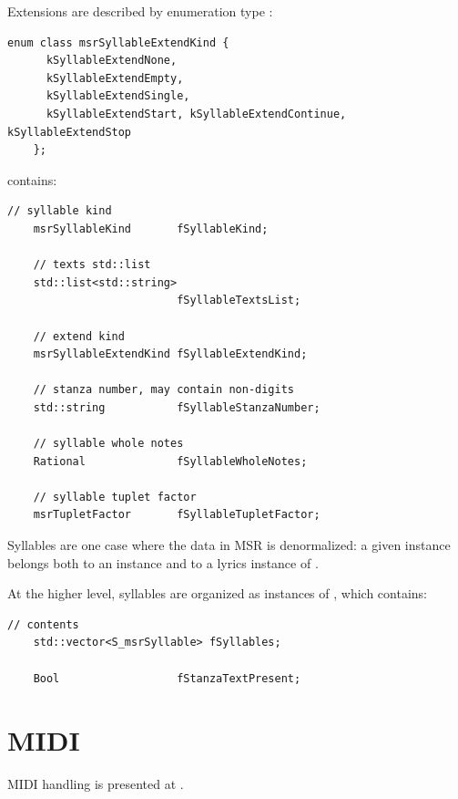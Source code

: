 Extensions are described by enumeration type {\tt }:
\begin{lstlisting}[language=CPlusPlus]
    enum class msrSyllableExtendKind {
      kSyllableExtendNone,
      kSyllableExtendEmpty,
      kSyllableExtendSingle,
      kSyllableExtendStart, kSyllableExtendContinue, kSyllableExtendStop
    };
\end{lstlisting}

 contains:
\begin{lstlisting}[language=CPlusPlus]
    // syllable kind
    msrSyllableKind       fSyllableKind;

    // texts std::list
    std::list<std::string>
                          fSyllableTextsList;

    // extend kind
    msrSyllableExtendKind fSyllableExtendKind;

    // stanza number, may contain non-digits
    std::string           fSyllableStanzaNumber;

    // syllable whole notes
    Rational              fSyllableWholeNotes;

    // syllable tuplet factor
    msrTupletFactor       fSyllableTupletFactor;
\end{lstlisting}

Syllables are one case where the data in MSR is denormalized: a given  instance belongs both to an  instance and to a lyrics instance of .

At the higher level, syllables are organized as instances of , which contains:
\begin{lstlisting}[language=CPlusPlus]
    // contents
    std::vector<S_msrSyllable> fSyllables;

    Bool                  fStanzaTextPresent;
\end{lstlisting}


\section{MIDI}\label{MIDI}

MIDI handling is presented at .
